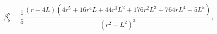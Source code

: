 \begin{equation}
\beta_8^{2}=\frac{1}{5}\frac{(r-4L)(4r^5+16r^4 L+44r^3 L^2 +176 r^2
L^3 +764 r L^4 -5 L^5)}{(r^2-L^2)^3},
\end{equation}

